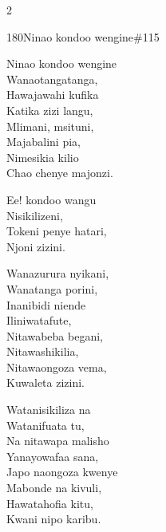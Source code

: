 \begin{multicols}{2}
\begin{hymn}{180}{Ninao kondoo wengine}{\#115}
\begin{stanza}
Ninao kondoo wengine\\
Wanaotangatanga,\\
Hawajawahi kufika\\
Katika zizi langu,\\
Mlimani, msituni,\\
Majabalini pia,\\
Nimesikia kilio\\
Chao chenye majonzi.
\end{stanza}
\begin{chorus}
Ee! kondoo wangu\\
Nisikilizeni,\\
Tokeni penye hatari,\\
Njoni zizini.
\end{chorus}
\begin{stanza}
Wanazurura nyikani,\\
Wanatanga porini,\\
Inanibidi niende\\
Iliniwatafute,\\
Nitawabeba begani,\\
Nitawashikilia,\\
Nitawaongoza vema,\\
Kuwaleta zizini.
\end{stanza}
\begin{stanza}
Watanisikiliza na\\
Watanifuata tu,\\
Na nitawapa malisho\\
Yanayowafaa sana,\\
Japo naongoza kwenye\\
Mabonde na kivuli,\\
Hawatahofia kitu,\\
Kwani nipo karibu.
\end{stanza}
\end{hymn}


\end{multicols}
